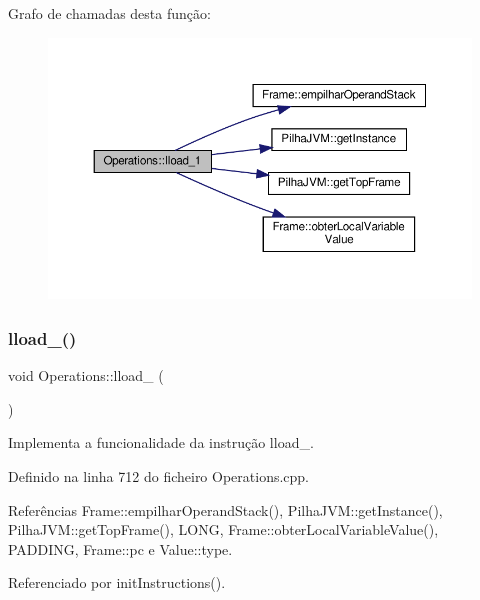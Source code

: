 Grafo de chamadas desta função\+:\nopagebreak
\begin{figure}[H]
\begin{center}
\leavevmode
\includegraphics[width=350pt]{classOperations_a34e91f6520ca574abce6b2b30ce91948_cgraph}
\end{center}
\end{figure}
\mbox{\label{classOperations_aa59772a5ed2bd59de3d54c635f294e93}} 
\subsubsection{\texorpdfstring{lload\+\_()}{lload\_2()}}
{\footnotesize\ttfamily void Operations\+::lload\+\_ (\begin{DoxyParamCaption}{ }\end{DoxyParamCaption})\hspace{0.3cm}{\ttfamily [private]}}



Implementa a funcionalidade da instrução lload\+\_. 



Definido na linha 712 do ficheiro Operations.\+cpp.



Referências Frame\+::empilhar\+Operand\+Stack(), Pilha\+J\+V\+M\+::get\+Instance(), Pilha\+J\+V\+M\+::get\+Top\+Frame(), L\+O\+NG, Frame\+::obter\+Local\+Variable\+Value(), P\+A\+D\+D\+I\+NG, Frame\+::pc e Value\+::type.



Referenciado por init\+Instructions().

